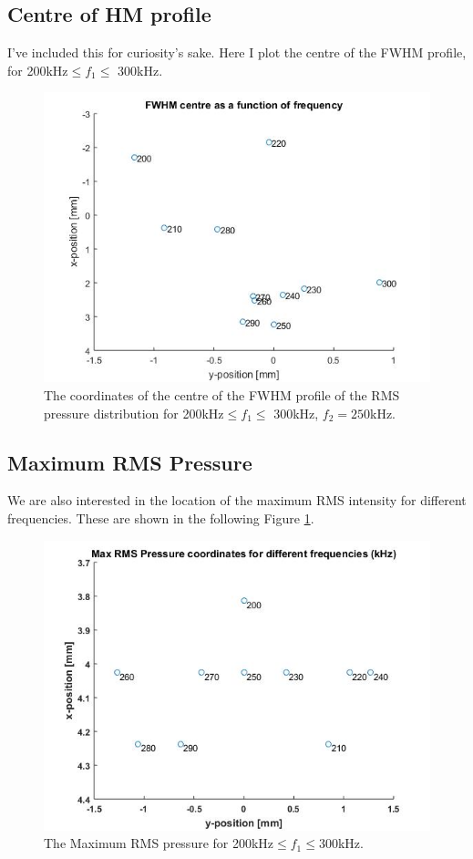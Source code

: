 \documentclass[10pt,a4paper]{article}
\begin{document}
\subsection{Centre of HM profile}

I've included this for curiosity's sake. Here I plot the centre of the FWHM profile, for 200kHz$\leq f_1 \leq$ 300kHz.
\begin{figure}[!h]
\centering
\includegraphics[scale=0.6]{FWHM_centre}
\caption{The coordinates of the centre of the FWHM profile of the RMS pressure distribution for 200kHz$\leq f_1 \leq$ 300kHz, $f_2 = 250$kHz.}
\end{figure}

\subsection{Maximum RMS Pressure}

We are also interested in the location of the maximum RMS intensity for different frequencies. These are shown in the following Figure \ref{RMS_Max}. 

\begin{figure}[!h] \label{RMS_Max}
\centering
\includegraphics[scale=0.65]{Max_RMS_pressure_coords}
\caption{The Maximum RMS pressure for 200kHz$\leq f_1 \leq$300kHz.} 
\end{figure}
\end{document}
